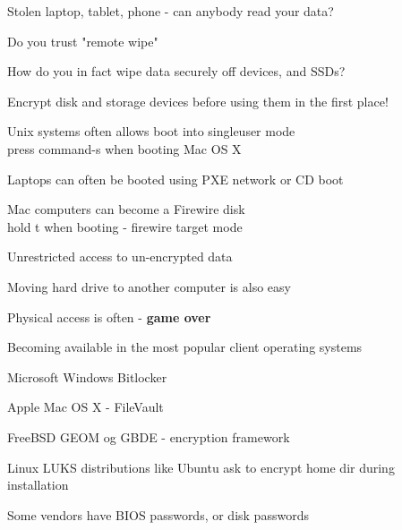 \documentclass[Screen16to9,17pt]{foils}
\begin{document}


\begin{list1}
\item Stolen laptop, tablet, phone - can anybody read your data?
\item Do you trust "remote wipe"
\item How do you in fact wipe data securely off devices, and SSDs?
\item Encrypt disk and storage devices before using them in the first place!
\end{list1}


\begin{list1}
\item Unix systems often allows boot into singleuser mode\\
press command-s when booting Mac OS X
\item Laptops can often be booted using PXE network or CD boot
\item Mac computers can become a Firewire disk\\
hold t when booting - firewire target mode
\item Unrestricted access to un-encrypted data
\item Moving hard drive to another computer is also easy
\end{list1}
\pause
\centerline{Physical access is often - {\bf game over}}




\begin{list1}
\item Becoming available in the most popular client operating systems
\begin{list2}
\item Microsoft Windows Bitlocker
\item Apple Mac OS X - FileVault
\item FreeBSD GEOM og GBDE - encryption framework
\item Linux LUKS distributions like Ubuntu ask to encrypt home dir during installation
\item Some vendors have BIOS passwords, or disk passwords
\end{list2}
\end{list1}
\end{document}
